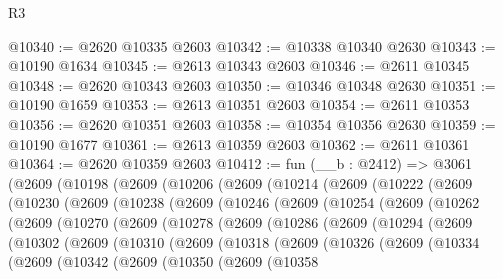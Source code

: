 \begin{lexlean}{R3}
\begin{coremodule}
@10340 := @2620 @10335 @2603
@10342 := @10338 @10340 @2630
@10343 := @10190 @1634
@10345 := @2613 @10343 @2603
@10346 := @2611 @10345
@10348 := @2620 @10343 @2603
@10350 := @10346 @10348 @2630
@10351 := @10190 @1659
@10353 := @2613 @10351 @2603
@10354 := @2611 @10353
@10356 := @2620 @10351 @2603
@10358 := @10354 @10356 @2630
@10359 := @10190 @1677
@10361 := @2613 @10359 @2603
@10362 := @2611 @10361
@10364 := @2620 @10359 @2603
@10412 := fun (__b : @2412) =>
  @3061
    (@2609
      (@10198
        (@2609
          (@10206
            (@2609
              (@10214
                (@2609
                  (@10222
                    (@2609
                      (@10230
                        (@2609
                          (@10238
                            (@2609
                              (@10246
                                (@2609
                                  (@10254
                                    (@2609
                                      (@10262
                                        (@2609
                                          (@10270
                                            (@2609
                                              (@10278
                                                (@2609
                                                  (@10286
                                                    (@2609
                                                      (@10294
                                                        (@2609
                                                          (@10302
                                                            (@2609
                                                              (@10310
                                                                (@2609
                                                                  (@10318
                                                                    (@2609
                                                                      (@10326
                                                                        (@2609
                                                                          (@10334
                                                                            (@2609
                                                                              (@10342
                                                                                (@2609
                                                                                  (@10350
                                                                                    (@2609
                                                                                      (@10358

\end{coremodule}
\end{lexlean}
